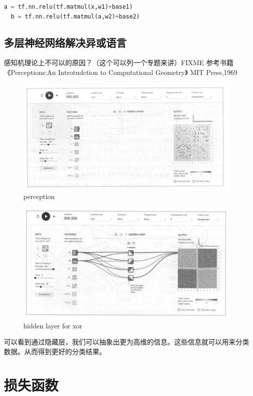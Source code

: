 \documentclass{article}\usepackage{float}\usepackage{listings} \usepackage{braket} \usepackage{amsmath,amssymb} \usepackage{geometry} \usepackage{graphicx} \usepackage{fancyvrb}\usepackage{braket} \usepackage{bm}\usepackage{hyperref} \usepackage{CJKutf8} \geometry{left=0.2cm,right=0.2cm,top=0.2cm,bottom=0.2cm} \renewcommand{\theequation}{\arabic{section}.\arabic{equation}} \renewcommand{\baselinestretch}{1.5}
\begin{document}
\begin{CJK}{UTF8}{gbsn}
\begin{lstlisting}[language=python]
  a = tf.nn.relu(tf.matmul(x,w1)+base1)
  b = tf.nn.relu(tf.matmul(a,w2)+base2)
\end{lstlisting}

\subsection{多层神经网络解决异或语言}
\label{sec:org32c6c09}

感知机理论上不可以的原因？（这个可以列一个专题来讲）FIXME 参考书籍《Perceptions:An Introtudction to Computational Geometry》 MIT Press,1969

\begin{figure}[H]
  \centering
  \includegraphics[width=0.8\linewidth]{perc.png}
  \caption{perception}
  \label{nosome}
\end{figure}

\begin{figure}[H]
  \centering
  \includegraphics[width=0.9\linewidth]{deep.png}
  \caption{hidden layer for xor}
  \label{tdkks1}
\end{figure}

可以看到通过隐藏层，我们可以抽象出更为高维的信息。这些信息就可以用来分类数据。从而得到更好的分类结果。

\section{损失函数}
\label{sec:org8d79a79}


\end{CJK}
\end{document}
